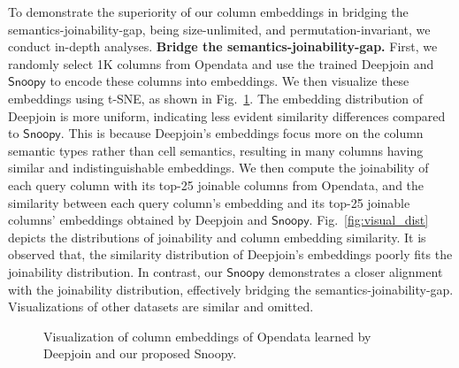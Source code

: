 To demonstrate the superiority of our column embeddings in bridging the semantics-joinability-gap, being size-unlimited, and permutation-invariant, we conduct in-depth analyses.
\noindent \textbf{Bridge the semantics-joinability-gap.}
First, we randomly select 1K columns from Opendata and use the trained Deepjoin and   $\textsf{Snoopy}$ to encode these columns into embeddings. We then visualize these embeddings using t-SNE, as shown in Fig.~\ref{fig:visual_embed}. The embedding distribution of Deepjoin is more uniform, indicating less evident similarity differences compared to $\textsf{Snoopy}$. This is because Deepjoin's embeddings focus more on the column semantic types rather than cell semantics, resulting in many columns having similar and indistinguishable embeddings.
We then compute the joinability of each query column with its top-25 joinable columns from Opendata, and the similarity between each query column's embedding and its top-25 joinable columns' embeddings obtained by Deepjoin and $\textsf{Snoopy}$.
Fig.~\ref{fig:visual_dist} depicts the distributions of joinability and column embedding similarity. It is observed that, the similarity distribution of Deepjoin's embeddings poorly fits the joinability distribution. In contrast, our $\textsf{Snoopy}$ demonstrates a closer alignment with the joinability distribution, effectively bridging the semantics-joinability-gap. Visualizations of other
datasets are similar and omitted.

\begin{figure}
\centering
{}
\hspace{7mm} 
\caption{Visualization of column embeddings of Opendata learned by Deepjoin and our proposed \textsf{Snoopy}.
}
\label{fig:visual_embed}
\vspace{-3mm}
\end{figure}


